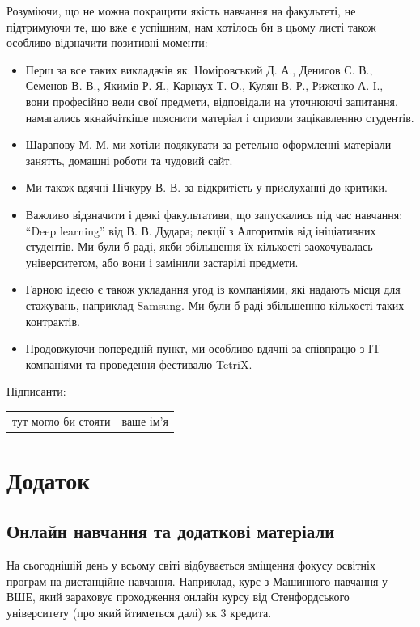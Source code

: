 \documentclass[14pt, a4paper]{extarticle}  %
\begin{document}
Розуміючи, що не можна покращити якість навчання на факультеті, не підтримуючи те, що вже є успішним, нам хотілось би в цьому листі також особливо  відзначити позитивні моменти:
\begin{itemize}
    \item Перш за все таких викладачів як: Номіровський Д. А., Денисов С. В., Семенов В. В., Якимів Р. Я., Карнаух Т. О., Кулян В. Р., Риженко А. І., --- вони професійно вели свої предмети, відповідали на уточнюючі запитання, намагались якнайчіткіше пояснити матеріал і сприяли зацікавленню студентів. 

\item Шарапову М. М.  ми хотіли подякувати за ретельно оформленні матеріали занятть, домашні роботи та чудовий сайт. 

\item Ми також вдячні Пічкуру В. В. за відкритість у прислуханні до критики.

\item Важливо відзначити і деякі факультативи, що запускались під час навчання: ``Deep learning'' від В. В. Дудара; лекції з Алгоритмів від ініціативних студентів. Ми були б раді, якби збільшення їх кількості заохочувалась університетом, або вони і замінили застарілі предмети.

\item Гарною ідеєю є також укладання угод із компаніями, які надають місця для стажувань, наприклад Samsung. Ми були б раді збільшенню кількості таких контрактів.

\item Продовжуючи попередній пункт, ми особливо вдячні за співпрацю з IT-компаніями та проведення фестивалю TetriX. 
\end{itemize}

\newpage
Підписанти:

\begin{tabular}{c|c}
\hline
тут могло би стояти & ваше ім'я \\
\end{tabular}


\newpage\section{Додаток}

\subsection{Онлайн навчання та додаткові матеріали}
\label{Additional materials}
На сьогоднішій день у всьому світі відбувається зміщення фокусу освітніх програм на дистанційне навчання. Наприклад, \href{https://www.hse.ru/ba/am/courses/219906616.html}{курс з Машинного навчання} у ВШЕ, який зараховує проходження онлайн курсу від Стенфордського університету (про який йтиметься далі) як 3 кредита.
\end{document}
